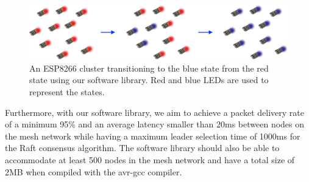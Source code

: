 \begin{figure}[H]
    \centering
    \includegraphics[width=0.7\columnwidth]{final-proposal/images/mesh_signal_propagation.png}
    \caption{An ESP8266 cluster transitioning to the blue state from the red state using our software library. Red and blue LEDs are used to represent the states.}
    \label{fig:mesh_signal_propagation}
\end{figure}


Furthermore, with our software library, we aim to achieve a packet delivery rate of a minimum 95\% and an average latency smaller than 20ms between nodes on the mesh network while having a maximum leader selection time of 1000ms for the Raft consensus algorithm. The software library should also be able to accommodate at least 500 nodes in the mesh network and have a total size of 2MB when compiled with the avr-gcc compiler.




